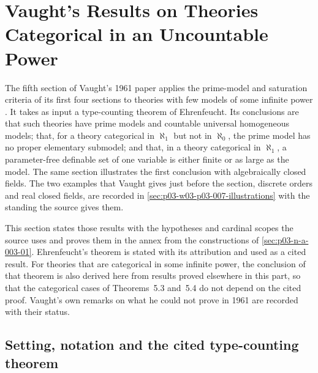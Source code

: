 \section{Vaught's Results on Theories Categorical in an Uncountable Power}
\label{sec:p03-w03-p03-007-vaught-categorical}

The fifth section of Vaught's 1961 paper applies the prime-model and
saturation criteria of its first four sections to theories with few models
of some infinite power \cite[\S~5, pp.~315--318]{Vaught1961}. It takes as
input a type-counting theorem of Ehrenfeucht. Its conclusions are that such
theories have prime models and countable universal homogeneous models; that,
for a theory categorical in \(\aleph_1\) but not in \(\aleph_0\), the prime
model has no proper elementary submodel; and that, in a theory categorical
in \(\aleph_1\), a parameter-free definable set of one variable is either
finite or as large as the model. The same section illustrates the first
conclusion with algebraically closed fields. The two examples that Vaught
gives just before the section, discrete orders and real closed fields, are
recorded in \cref{sec:p03-w03-p03-007-illustrations} with the standing the
source gives them.

This section states those results with the hypotheses and cardinal scopes
the source uses and proves them in the annex from the constructions of
\cref{sec:p03-n-a-003-01}. Ehrenfeucht's theorem is stated with its
attribution and used as a cited result. For theories that are categorical
in some infinite power, the conclusion of that theorem is also derived here
from results proved elsewhere in this part, so that the categorical cases
of Theorems~5.3 and~5.4 do not depend on the cited proof. Vaught's own
remarks on what he could not prove in 1961 are recorded with their status.

\subsection{Setting, notation and the cited type-counting theorem}
\label{sec:p03-w03-p03-007-setting}

